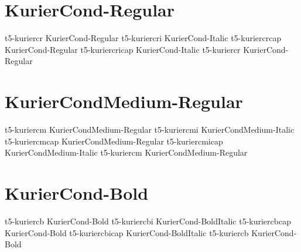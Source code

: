 \documentclass[sample]{vnsample}
\begin{document}
\section{KurierCond-Regular}
     {t5-kuriercr}     {KurierCond-Regular}
    {t5-kuriercri}    {KurierCond-Italic}
    {t5-kuriercrcap}  {KurierCond-Regular}
  {t5-kuriercricap} {KurierCond-Italic}
     {t5-kuriercr}     {KurierCond-Regular}

\section{KurierCondMedium-Regular}
    {t5-kuriercm}     {KurierCondMedium-Regular}
   {t5-kuriercmi}    {KurierCondMedium-Italic}
   {t5-kuriercmcap}  {KurierCondMedium-Regular}
 {t5-kuriercmicap} {KurierCondMedium-Italic}
    {t5-kuriercm}     {KurierCondMedium-Regular}

\section{KurierCond-Bold}
     {t5-kuriercb}     {KurierCond-Bold}
    {t5-kuriercbi}    {KurierCond-BoldItalic}
    {t5-kuriercbcap}  {KurierCond-Bold}
  {t5-kuriercbicap} {KurierCond-BoldItalic}
     {t5-kuriercb}     {KurierCond-Bold}
\end{document}

